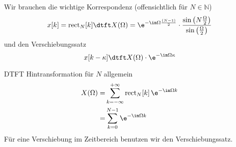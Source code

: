 \begin{Werkzeug}
Wir brauchen die wichtige Korrespondenz (offensichtlich für $N\in\mathbb{N}$)
\begin{equation}
x[k] = \mathrm{rect}_N[k]
\dtft
X(\Omega)=\e^{-\im\Omega\frac{(N-1)}{2}}\cdot\frac{\sin\left(N\frac{\Omega}{2}\right)}{\sin\left(\frac{\Omega}{2}\right)}
\end{equation}
und den Verschiebungssatz
\begin{equation}
x[k-\kappa]
\dtft
X(\Omega) \cdot \e^{-\im\Omega\kappa}
\end{equation}
\end{Werkzeug}
\begin{Ansatz}
DTFT Hintransformation für $N$ allgemein
\begin{align}
X(\Omega)
=& \sum_{k=-\infty}^{+\infty} \mathrm{rect}_N[k] \, \e^{-\im\Omega k}\\
=& \sum_{k=0}^{N-1} \e^{-\im\Omega k}
\end{align}
Für eine Verschiebung im Zeitbereich benutzen wir den Verschiebungssatz.
\end{Ansatz}

